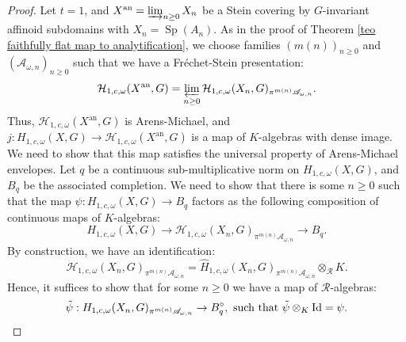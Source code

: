 \documentclass{amsart}
\newcommand{\Sp}{\operatorname{Sp}}
\begin{document}
 \begin{proof}
Let $t=1$, and  $X^{\operatorname{an}}=\varinjlim_{n\geq 0} X_n$ be a Stein covering by $G$-invariant affinoid subdomains with $X_n=\Sp(A_n)$.  As in the proof of Theorem \ref{teo faithfully flat map to analytification}, we choose families $(m(n))_{n\geq 0}$ and $(\mathscr{A}_{\omega,n})_{n\geq 0}$ such that we have a Fréchet-Stein presentation:
\begin{equation}\label{equation FS presentation in A-M proof}
    \mathcal{H}_{1,c,\omega}(X^{\operatorname{an}},G)=\varprojlim_{n\geq 0}\mathcal{H}_{1,c,\omega}(X_n,G)_{\pi^{m(n)}\mathscr{A}_{\omega,n}}.
\end{equation}
Thus, $\mathcal{H}_{1,c,\omega}(X^{\operatorname{an}},G)$ is Arens-Michael, and $j:H_{1,c,\omega}(X,G)\rightarrow \mathcal{H}_{1,c,\omega}(X^{\operatorname{an}},G)$ is a map of $K$-algebras with dense image. We need to show that this map satisfies the universal property of Arens-Michael envelopes. Let $q$ be a continuous sub-multiplicative norm on $H_{1,c,\omega}(X,G)$, and $B_q$ be the associated completion. We need to show that there is some $n\geq 0$ such that the map  $\psi:H_{1,c,\omega}(X,G)\rightarrow B_q$ factors as the following composition of continuous maps of $K$-algebras:
\begin{equation*}
    H_{1,c,\omega}(X,G)\rightarrow\mathcal{H}_{1,c,\omega}(X_n,G)_{\pi^{m(n)}\mathscr{A}_{\omega,n}}\rightarrow B_q.
\end{equation*}
By construction, we have an identification:
\begin{equation*}
    \mathcal{H}_{1,c,\omega}(X_n,G)_{\pi^{m(n)}\mathscr{A}_{\omega,n}}=\widehat{H}_{1,c,\omega}(X_n,G)_{\pi^{m(n)}\mathscr{A}_{\omega,n}}\otimes_{\mathcal{R}}K.
\end{equation*}
Hence, it suffices to show that for some $n\geq 0$  we have  a map of $\mathcal{R}$-algebras:
\begin{equation*}
   \Tilde{\psi}: H_{1,c,\omega}(X_n,G)_{\pi^{m(n)}\mathscr{A}_{\omega,n}}\rightarrow B^{\circ}_q, \textnormal{ such that  }\Tilde{\psi}\otimes_K \operatorname{Id}=\psi.
\end{equation*}


\end{proof}
\end{document}
